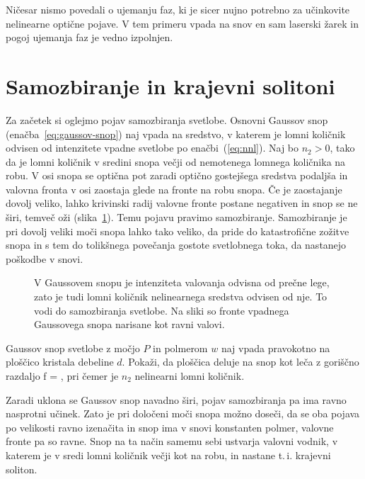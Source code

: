 \begin{remark}
Ničesar nismo povedali o ujemanju faz, ki je sicer nujno potrebno za učinkovite nelinearne 
optične pojave. V tem primeru vpada na snov en sam laserski žarek in pogoj ujemanja faz
je vedno izpolnjen. 
\end{remark}

\section{Samozbiranje in krajevni solitoni}
Za začetek si oglejmo pojav samozbiranja svetlobe. Osnovni Gaussov snop 
(enačba~\ref{eq:gaussov-snop}) naj vpada na sredstvo,
v katerem je lomni količnik odvisen od intenzitete vpadne svetlobe po enačbi~(\ref{eq:nnl}).
Naj bo $n_{2}>0$, tako da je lomni količnik v sredini snopa večji 
od nemotenega lomnega količnika na robu. V osi snopa se optična pot 
zaradi optično gostejšega sredstva podaljša in valovna fronta 
v osi zaostaja glede na fronte na robu snopa. Če je zaostajanje dovolj veliko,
lahko krivinski radij valovne fronte postane negativen in snop se
ne širi, temveč oži (slika~\ref{fig:sf1}). Temu pojavu pravimo 
samozbiranje. Samozbiranje je pri dovolj
veliki moči snopa lahko tako veliko, da pride do katastrofične zožitve snopa
in s tem do tolikšnega povečanja gostote svetlobnega toka, da nastanejo
poškodbe v snovi.
\begin{figure}[h]
\centering
\def\svgwidth{100truemm} 

\caption{V Gaussovem snopu je intenziteta valovanja odvisna od prečne lege, zato
 je tudi lomni količnik nelinearnega sredstva odvisen od nje. To vodi do 
 samozbiranja svetlobe. Na sliki so fronte vpadnega Gaussovega snopa narisane kot ravni valovi.}
\label{fig:sf1}
\end{figure}

\begin{definition}
Gaussov snop svetlobe z močjo $P$ in polmerom $w$ naj vpada pravokotno na ploščico
kristala debeline $d$. Pokaži, da ploščica deluje na snop kot leča z goriščno razdaljo 
\beq
f = ,
\eeq
pri čemer je $n_2$ nelinearni lomni količnik.
\end{definition}

Zaradi uklona se Gaussov snop navadno širi, pojav samozbiranja pa ima ravno nasprotni
učinek. Zato je pri določeni moči snopa možno doseči, da se oba pojava po
velikosti ravno izenačita in snop ima v snovi konstanten polmer, valovne
fronte pa so ravne. Snop na ta način samemu sebi ustvarja valovni vodnik, v katerem 
je v sredi lomni količnik večji kot na robu, in nastane t.\,i. krajevni soliton.

